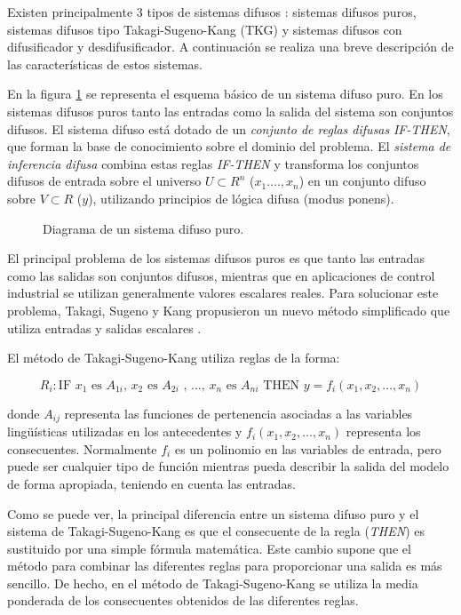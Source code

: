 Existen principalmente 3 tipos de sistemas difusos \cite{wang1997}: sistemas difusos puros, sistemas difusos tipo Takagi-Sugeno-Kang (TKG) y sistemas difusos con difusificador y desdifusificador. A continuación se realiza una breve descripción de las características de estos sistemas.

En la figura \ref{fig:pure-fuzzy-system} se representa el esquema básico de un sistema difuso puro. En los sistemas difusos puros tanto las entradas como la salida del sistema son conjuntos difusos. El sistema difuso está dotado de un \emph{conjunto de reglas difusas} \emph{IF-THEN}, que forman la base de conocimiento sobre el dominio del problema. El \emph{sistema de inferencia difusa} combina estas reglas \emph{IF-THEN} y transforma los conjuntos difusos de entrada sobre el universo $U \subset R^{n}$ ($x_{1}.\ldots,x_{n}$) en un conjunto difuso sobre $V \subset R$ ($y$), utilizando principios de lógica difusa (modus ponens).

\begin{figure}[tb]
	\centering
	
	\caption{Diagrama de un sistema difuso puro.}
	\label{fig:pure-fuzzy-system}
\end{figure}

El principal problema de los sistemas difusos puros es que tanto las entradas como las salidas son conjuntos difusos, mientras que en aplicaciones de control industrial se utilizan generalmente valores escalares reales. Para solucionar este problema, Takagi, Sugeno y Kang propusieron un nuevo método simplificado que utiliza entradas y salidas escalares \cite{takagisugeno1985}\cite{sugenokang1988}.

El método de Takagi-Sugeno-Kang utiliza reglas de la forma:

\begin{equation}
R_{i}: \text{IF }x_{1}\text{ es }A_{1i}\text{, }x_{2}\text{ es }A_{2i}\text{ , \ldots , }x_{n}\text{ es }A_{ni}\text{ THEN } y = f_{i}(x_{1},x_{2},\ldots,x_{n})
\end{equation}

donde $A_{ij}$ representa las funciones de pertenencia asociadas a las variables lingüísticas utilizadas en los antecedentes y $f_{i}(x_{1},x_{2},\ldots,x_{n})$ representa los consecuentes. Normalmente $f_{i}$ es un polinomio en las variables de entrada, pero puede ser cualquier tipo de función mientras pueda describir la salida del modelo de forma apropiada, teniendo en cuenta las entradas. 

Como se puede ver, la principal diferencia entre un sistema difuso puro y el sistema de Takagi-Sugeno-Kang es que el consecuente de la regla (\emph{THEN}) es sustituido por una simple fórmula matemática. Este cambio supone que el método para combinar las diferentes reglas para proporcionar una salida es más sencillo. De hecho, en el método de Takagi-Sugeno-Kang se utiliza la media ponderada de los consecuentes obtenidos de las diferentes reglas.

